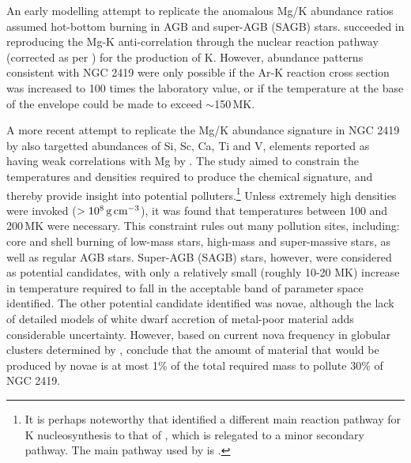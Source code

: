 \documentclass[a4paper,fleqn,usenatbib]{mnras}
\begin{document}

An early modelling attempt to replicate the anomalous Mg/K abundance ratios assumed hot-bottom burning in AGB and super-AGB (SAGB) stars. \cite{ventura2012} succeeded in reproducing the Mg-K anti-correlation through the nuclear reaction pathway  (corrected as per \cite{iliadis2016}) for the production of K. However, abundance patterns consistent with NGC 2419 were only possible if the Ar-K reaction cross section was increased to 100 times the laboratory value, or if the temperature at the base of the envelope could be made to exceed $\sim$150\,MK.

A more recent attempt to replicate the Mg/K abundance signature in NGC 2419 by \cite{iliadis2016} also targetted abundances of Si, Sc, Ca, Ti and V, elements reported as having weak correlations with Mg by \cite{cohenkirby2012}. The study aimed to constrain the temperatures and densities required to produce the chemical signature, and thereby provide insight into potential polluters.\footnote{It is perhaps noteworthy that \cite{iliadis2016} identified a different main reaction pathway for K nucleosynthesis to that of \cite{ventura2012}, which is relegated to a minor secondary pathway. The main pathway used by \cite{iliadis2016} is .}
Unless extremely high densities were invoked ($>10^8\,{\rm g\,cm}^{-3}$), it was found that temperatures between 100 and 200\,MK were necessary. This constraint rules out many pollution sites, including: core and shell burning of low-mass stars, high-mass and super-massive stars, as well as regular AGB stars. Super-AGB (SAGB) stars, however, were considered as potential candidates, with only a relatively small (roughly 10-20 MK) increase in temperature required to fall in the acceptable band of parameter space identified. The other potential candidate identified was novae, although the lack of detailed models of white dwarf accretion of metal-poor material adds considerable uncertainty. However, based on current nova frequency in globular clusters determined by \cite{kato2013novae}, \cite{iliadis2016} conclude that the amount of material that would be produced by novae is at most 1\% of the total required mass to pollute 30\% of NGC 2419.
\end{document}
